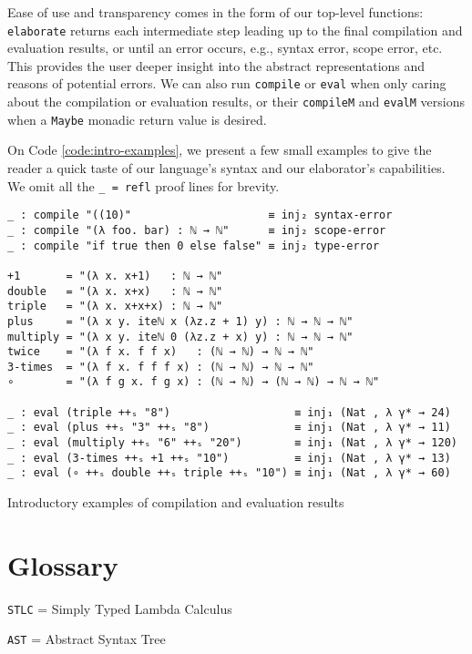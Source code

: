 Ease of use and transparency comes in the form of our top-level functions: \verb$elaborate$ returns each intermediate step leading up to the final compilation and evaluation results, or until an error occurs, e.g., syntax error, scope error, etc. This provides the user deeper insight into the abstract representations and reasons of potential errors. We can also run \verb$compile$ or \verb$eval$ when only caring about the compilation or evaluation results, or their \verb$compileM$ and \verb$evalM$ versions when a \verb$Maybe$ monadic return value is desired.

On Code \ref{code:intro-examples}, we present a few small examples to give the reader a quick taste of our language's syntax and our elaborator's capabilities. We omit all the \verb$_ = refl$ proof lines for brevity.

\begin{listing}[H]
\begin{verbatim}
_ : compile "((10)"                     ≡ inj₂ syntax-error
_ : compile "(λ foo. bar) : ℕ → ℕ"      ≡ inj₂ scope-error
_ : compile "if true then 0 else false" ≡ inj₂ type-error

+1       = "(λ x. x+1)   : ℕ → ℕ"
double   = "(λ x. x+x)   : ℕ → ℕ"
triple   = "(λ x. x+x+x) : ℕ → ℕ"
plus     = "(λ x y. iteℕ x (λz.z + 1) y) : ℕ → ℕ → ℕ"
multiply = "(λ x y. iteℕ 0 (λz.z + x) y) : ℕ → ℕ → ℕ"
twice    = "(λ f x. f f x)   : (ℕ → ℕ) → ℕ → ℕ"
3-times  = "(λ f x. f f f x) : (ℕ → ℕ) → ℕ → ℕ"
∘        = "(λ f g x. f g x) : (ℕ → ℕ) → (ℕ → ℕ) → ℕ → ℕ"

_ : eval (triple ++ₛ "8")                   ≡ inj₁ (Nat , λ γ* → 24)
_ : eval (plus ++ₛ "3" ++ₛ "8")             ≡ inj₁ (Nat , λ γ* → 11)
_ : eval (multiply ++ₛ "6" ++ₛ "20")        ≡ inj₁ (Nat , λ γ* → 120)
_ : eval (3-times ++ₛ +1 ++ₛ "10")          ≡ inj₁ (Nat , λ γ* → 13)
_ : eval (∘ ++ₛ double ++ₛ triple ++ₛ "10") ≡ inj₁ (Nat , λ γ* → 60)
\end{verbatim}
\caption{Introductory examples of compilation and evaluation results}
\label{code:intro-examples}
\end{listing}

\newpage

\section{Glossary}

\verb$STLC$ = Simply Typed Lambda Calculus

\verb$AST$ = Abstract Syntax Tree

